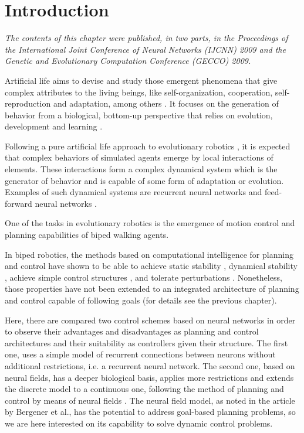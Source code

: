 \label{ch:chp2}
\section{Introduction}
\emph{The contents of this chapter were published, in two parts, in
  the Proceedings of the International Joint Conference of Neural
  Networks (IJCNN) 2009 and the Genetic and Evolutionary Computation
  Conference (GECCO) 2009.}

Artificial life aims to devise and study those emergent phenomena that
give complex attributes to the living beings, like self-organization,
cooperation, self-reproduction and adaptation, among others
\cite{Bedau92Philosophical}. It focuses on the generation of behavior
from a biological, bottom-up perspective that relies on evolution,
development and learning \cite{Dyer94Toward}.

Following a pure artificial life approach to evolutionary robotics
\cite{Nolfi04Evolutionary}, it is expected that complex behaviors of
simulated agents emerge by local interactions of elements. These
interactions form a complex dynamical system which is the generator of
behavior and is capable of some form of adaptation or
evolution. Examples of such dynamical systems are recurrent neural
networks \cite{Huelse04Structure} and feed-forward neural networks
\cite{Stanley02Evolving}.

One of the tasks in evolutionary robotics is the emergence of motion
control and planning capabilities of biped walking agents.

In biped robotics, the methods based on computational intelligence for
planning and control have shown to be able to achieve static stability
\cite{Kun97Adaptive}, dynamical stability
\cite{Nakanishi2004b,Komatsu05Dynamic}, achieve simple control
structures \cite{Huelse04Structure}, and tolerate perturbations
\cite{Juang02Intelligent}. Nonetheless, those properties have not been
extended to an integrated architecture of planning and control capable
of following goals (for details see the previous chapter).

Here, there are compared two control schemes based on neural networks
in order to observe their advantages and disadvantages as planning and
control architectures and their suitability as controllers given their
structure. The first one, uses a simple model of recurrent connections
between neurons without additional restrictions, i.e. a recurrent
neural network. The second one, based on neural fields, has a deeper
biological basis, applies more restrictions and extends the discrete
model to a continuous one, following the method of planning and
control by means of neural fields \cite{Bergener99Complex}. The neural
field model, as noted in the article by Bergener et al., has the
potential to address goal-based planning problems, so we are here
interested on its capability to solve dynamic control problems.

